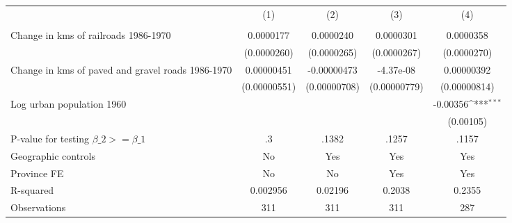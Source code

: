 {
\def\sym#1{\ifmmode^{#1}\else\(^{#1}\)\fi}
\begin{tabular}{l*{4}{c}}
\hline\hline
                &\multicolumn{1}{c}{(1)}&\multicolumn{1}{c}{(2)}&\multicolumn{1}{c}{(3)}&\multicolumn{1}{c}{(4)}\\
                &\multicolumn{1}{c}{}&\multicolumn{1}{c}{}&\multicolumn{1}{c}{}&\multicolumn{1}{c}{}\\
\hline
Change in kms of railroads 1986-1970&0.0000177         &0.0000240         &0.0000301         &0.0000358         \\
                &(0.0000260)         &(0.0000265)         &(0.0000267)         &(0.0000270)         \\
[1em]
Change in kms of paved and gravel roads 1986-1970&0.00000451         &-0.00000473         &-4.37e-08         &0.00000392         \\
                &(0.00000551)         &(0.00000708)         &(0.00000779)         &(0.00000814)         \\
[1em]
Log urban population 1960&                  &                  &                  & -0.00356\sym{***}\\
                &                  &                  &                  &(0.00105)         \\
\hline
P-value for testing $\beta\_{2} >= \beta\_{1}$&       .3         &    .1382         &    .1257         &    .1157         \\
Geographic controls&       No         &      Yes         &      Yes         &      Yes         \\
Province FE     &       No         &       No         &      Yes         &      Yes         \\
R-squared       & 0.002956         &  0.02196         &   0.2038         &   0.2355         \\
Observations    &      311         &      311         &      311         &      287         \\
\hline\hline
\end{tabular}
}
